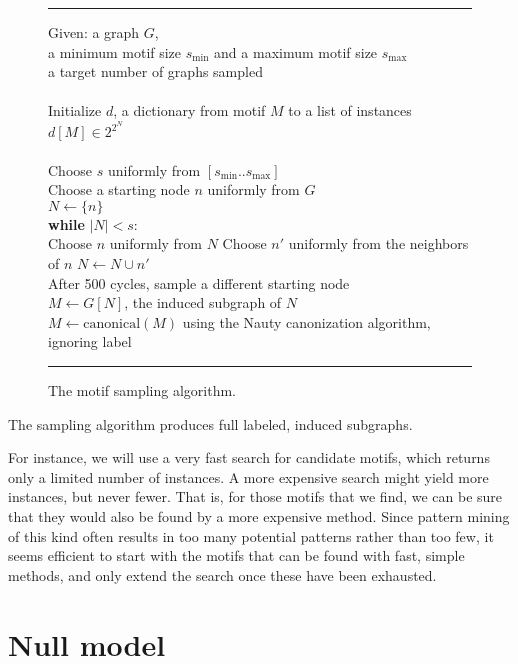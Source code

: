 \documentclass[11pt]{article}
\newcommand{\tab}{\hspace*{5mm}}
\newcommand{\from}{\leftarrow}
\begin{document}
\begin{figure}[bt]
{
\hrule
\vspace{3mm}
\raggedright
Given: a graph $G$, \\
\tab a minimum motif size $s_\text{min}$ and a maximum motif size $s_\text{max}$ \\
\tab a target number of graphs sampled\\
\tab\\
Initialize $d$, a dictionary from motif $M$ to a list of instances $d[M] \in 2^{2^N}$ \\ 
  \\
Choose $s$ uniformly from $[s_\text{min} .. s_\text{max}]$ \\
Choose a starting node $n$ uniformly from $G$ \\
$N \from \{n\}$ \\
\textbf{while} $|N| < s$:\\
\tab Choose $n$ uniformly from $N$
\tab Choose $n'$ uniformly from the neighbors of $n$
\tab $N \from N \cup n'$ \\
\tab After 500 cycles, sample a different starting node\\

$M \from G[N]$, the induced subgraph of $N$ \\
$M \from \text{canonical}(M)$ using the Nauty canonization algorithm, ignoring label \\
\vspace{3mm}
\hrule
}
\caption{The motif sampling algorithm.}
\label{figure:sampling}
\end{figure}


The sampling algorithm produces full labeled, induced subgraphs. 

For instance, we will use a very fast search for candidate motifs, which returns only a limited number of instances. A more expensive search might yield more instances, but never fewer. That is, for those motifs that we find, we can be sure that they would also be found by a more expensive method. Since pattern mining of this kind often results in too many potential patterns rather than too few, it seems efficient to start with the motifs that can be found with fast, simple methods, and only extend the search once these have been exhausted.


\section{Null model}

\label{section:null-model}
\end{document}
